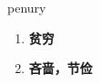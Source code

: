 
\begin{frame}
{\huge penury}
\begin{center}
\begin{enumerate}\Large
  \item \textbf{贫穷}
  \item \textbf{吝啬，节俭}
\end{enumerate}
\end{center}
\end{frame}

